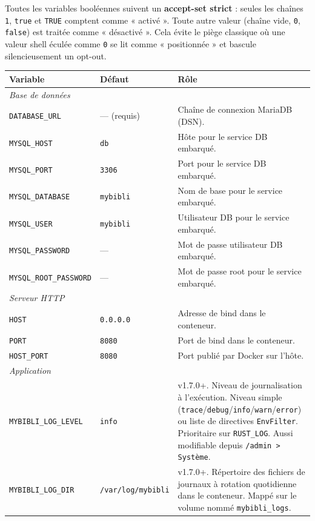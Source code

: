 Toutes les variables booléennes suivent un \textbf{accept-set strict}
: seules les chaînes \texttt{1}, \texttt{true} et \texttt{TRUE}
comptent comme « activé ». Toute autre valeur (chaîne vide,
\texttt{0}, \texttt{false}) est traitée comme « désactivé ». Cela
évite le piège classique où une valeur shell éculée comme \texttt{0}
se lit comme « positionnée » et bascule silencieusement un opt-out.

{\small
\begin{longtable}{l l >{\raggedright\arraybackslash}p{6.2cm}}
\toprule
\textbf{Variable} & \textbf{Défaut} & \textbf{Rôle} \\
\midrule
\endhead
\multicolumn{3}{l}{\emph{Base de données}} \\
\texttt{DATABASE\_URL}        & --- (requis) & Chaîne de connexion MariaDB (DSN). \\
\texttt{MYSQL\_HOST}          & \texttt{db}    & Hôte pour le service DB embarqué. \\
\texttt{MYSQL\_PORT}          & \texttt{3306}  & Port pour le service DB embarqué. \\
\texttt{MYSQL\_DATABASE}      & \texttt{mybibli} & Nom de base pour le service embarqué. \\
\texttt{MYSQL\_USER}          & \texttt{mybibli} & Utilisateur DB pour le service embarqué. \\
\texttt{MYSQL\_PASSWORD}      & --- & Mot de passe utilisateur DB embarqué. \\
\texttt{MYSQL\_ROOT\_PASSWORD}& --- & Mot de passe root pour le service embarqué. \\
\midrule
\multicolumn{3}{l}{\emph{Serveur HTTP}} \\
\texttt{HOST}                 & \texttt{0.0.0.0} & Adresse de bind dans le conteneur. \\
\texttt{PORT}                 & \texttt{8080}    & Port de bind dans le conteneur. \\
\texttt{HOST\_PORT}           & \texttt{8080}    & Port publié par Docker sur l'hôte. \\
\midrule
\multicolumn{3}{l}{\emph{Application}} \\
\texttt{MYBIBLI\_LOG\_LEVEL}  & \texttt{info}   & v1.7.0+. Niveau de journalisation à l'exécution. Niveau simple (\texttt{trace}/\texttt{debug}/\texttt{info}/\texttt{warn}/\texttt{error}) ou liste de directives \texttt{EnvFilter}. Prioritaire sur \texttt{RUST\_LOG}. Aussi modifiable depuis \texttt{/admin > Système}. \\
\texttt{MYBIBLI\_LOG\_DIR}    & \texttt{/var/log/mybibli} & v1.7.0+. Répertoire des fichiers de journaux à rotation quotidienne dans le conteneur. Mappé sur le volume nommé \texttt{mybibli\_logs}. \\

\end{longtable}}
